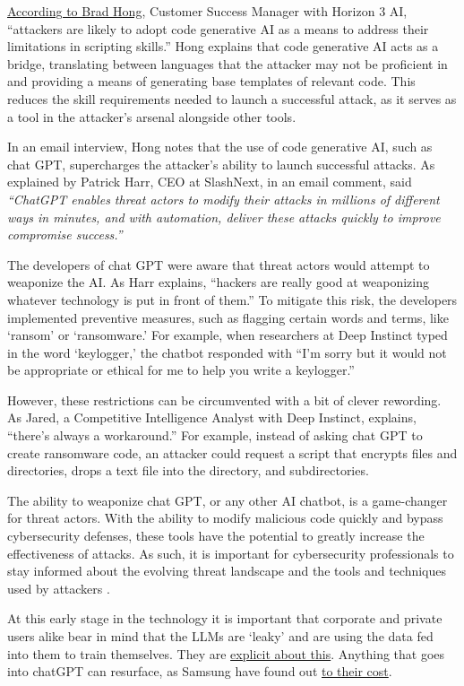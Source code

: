 \href{https://securityintelligence.com/news/are-threat-actors-using-chatgpt-to-hack-your-network/}{According to Brad Hong}, Customer Success Manager with Horizon 3 AI, ``attackers are likely to adopt code generative AI as a means to address their limitations in scripting skills.'' Hong explains that code generative AI acts as a bridge, translating between languages that the attacker may not be proficient in and providing a means of generating base templates of relevant code. This reduces the skill requirements needed to launch a successful attack, as it serves as a tool in the attacker's arsenal alongside other tools.\par
In an email interview, Hong notes that the use of code generative AI, such as chat GPT, supercharges the attacker's ability to launch successful attacks. As explained by Patrick Harr, CEO at SlashNext, in an email comment, said \textit{``ChatGPT enables threat actors to modify their attacks in millions of different ways in minutes, and with automation, deliver these attacks quickly to improve compromise success.''}\par
The developers of chat GPT were aware that threat actors would attempt to weaponize the AI. As Harr explains, ``hackers are really good at weaponizing whatever technology is put in front of them.'' To mitigate this risk, the developers implemented preventive measures, such as flagging certain words and terms, like `ransom' or `ransomware.' For example, when researchers at Deep Instinct typed in the word `keylogger,' the chatbot responded with ``I'm sorry but it would not be appropriate or ethical for me to help you write a keylogger.''\par
However, these restrictions can be circumvented with a bit of clever rewording. As Jared, a Competitive Intelligence Analyst with Deep Instinct, explains, ``there's always a workaround.'' For example, instead of asking chat GPT to create ransomware code, an attacker could request a script that encrypts files and directories, drops a text file into the directory, and subdirectories.\par
The ability to weaponize chat GPT, or any other AI chatbot, is a game-changer for threat actors. With the ability to modify malicious code quickly and bypass cybersecurity defenses, these tools have the potential to greatly increase the effectiveness of attacks. As such, it is important for cybersecurity professionals to stay informed about the evolving threat landscape and the tools and techniques used by attackers \cite{brundage2018malicious}.\par 
At this early stage in the technology it is important that corporate and private users alike bear in mind that the LLMs are `leaky' and are using the data fed into them to train themselves. They are \href{https://help.openai.com/en/articles/6783457-chatgpt-general-faq}{explicit about this}. Anything that goes into chatGPT can resurface, as Samsung have found out \href{https://cybernews.com/news/chatgpt-samsung-data-leak/}{to their cost}.
